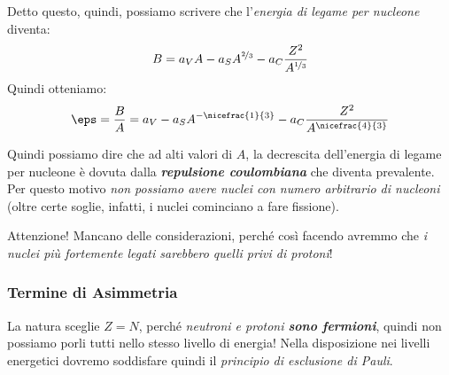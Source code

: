 Detto questo, quindi, possiamo scrivere che l'\textit{energia di legame per
	nucleone} diventa:
\begin{equation}
	B
	= a_V A - a_S A ^{\nicefrac{2}{3}} - a_C \frac{Z^2}{A^{\nicefrac{1}{3}}}
\end{equation}
Quindi otteniamo:
\begin{equation}
	\eps
	= \frac{B}{A}
	= a_V - a_S A^{-\nicefrac{1}{3}} - a_C \frac{Z^2}{A^{\nicefrac{4}{3}}}
\end{equation}

Quindi possiamo dire che ad alti valori di $A$, la decrescita dell'energia di
legame per nucleone è dovuta dalla \textit{\textbf{repulsione coulombiana}} che
diventa prevalente. Per questo motivo \textit{non possiamo avere nuclei con
	numero arbitrario di nucleoni} (oltre certe soglie, infatti, i nuclei
cominciano a fare fissione).

\begin{note}[]
	Attenzione! Mancano delle considerazioni, perché così facendo avremmo che
	\textit{i nuclei più fortemente legati sarebbero quelli privi di protoni}!
\end{note}

\subsubsection{Termine di Asimmetria}
La natura sceglie $Z = N$, perché \textit{neutroni e protoni
	\textbf{sono fermioni}}, quindi non possiamo porli tutti nello stesso livello
di energia! Nella disposizione nei livelli energetici dovremo soddisfare quindi
il \textit{principio di esclusione di Pauli}.

